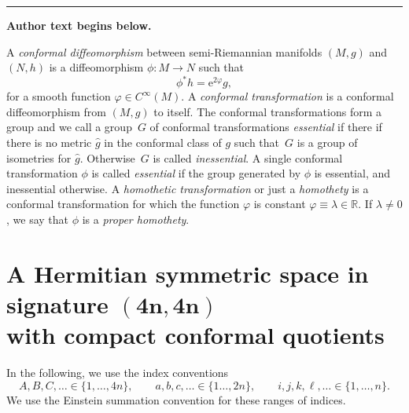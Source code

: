 \documentclass[11pt]{article}
\numberwithin{equation}{section}
\numberwithin{equation}{section}
\newcommand{\1}{\mathbf{1}}
\newcommand{\e}{\mathrm{e}}
\newcommand{\vf}{\varphi}
\newcommand{\+}{\oplus}
\renewcommand{\=}{\equiv}
\newcommand{\R}{\mathbb{R}}
\begin{document}
\medskip\hrule\medskip\noindent\textbf{Author text begins below.}\par
\setcounter{section}{1}
A {\em conformal diffeomorphism} between semi-Riemannian manifolds $(M,g)$ and $(N,h)$ is a diffeomorphism
$\phi\colon M\to N$ such that
\[\phi^*h=\e^{2\vf}g,\]
for a smooth function $\vf\in C^\infty(M)$. A {\em conformal transformation} is a conformal diffeomorphism from $(M,g)$ to itself.
The conformal transformations form a group and we call a group~$G$ of conformal transformations {\em essential} if there
if there is no metric $\hat g$ in the conformal class of $g$ such that~$G$ is a group of isometries for $\hat g$. Otherwise~$G$ is called {\em inessential}.
A single conformal transformation $\phi$ is called {\em essential} if the group generated by $\phi$ is essential, and inessential otherwise.
A {\em homothetic transformation} or just a {\em homothety} is a conformal transformation for which the function $\vf$ is constant $\vf\equiv\lambda\in \R$.
If $\lambda\not=0$, we say that $\phi$ is a {\em proper homothety}.


\section[A Hermitian symmetric space in signature (4n,4n) with compact conformal quotients]{A Hermitian symmetric space in signature $\boldsymbol{(4n,4n)}$ \\ with compact conformal quotients}
 In the following, we use the index conventions
\[A,B,C,\ldots \in \{1,\ldots, 4n\},\qquad a,b,c,\ldots\in \{1\ldots ,2n\},\qquad i,j,k,\ell,\ldots\in \{1,\ldots, n\}.\] We use the Einstein summation convention for these ranges of indices.
\end{document}
